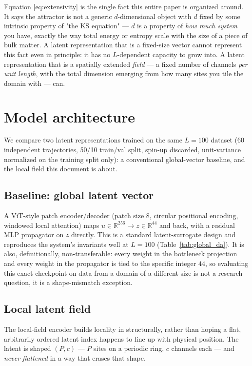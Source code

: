\documentclass[11pt]{article}
\begin{document}
Equation \eqref{eq:extensivity} is the single fact this entire paper is
organized around. It says the attractor is not a generic
$d$-dimensional object with $d$ fixed by some intrinsic property of
"the KS equation" --- $d$ is a property of \emph{how much system} you
have, exactly the way total energy or entropy scale with the size of a
piece of bulk matter. A latent representation that is a fixed-size
vector cannot represent this fact even in principle: it has no
$L$-dependent capacity to grow into. A latent representation that is a
spatially extended \emph{field} --- a fixed number of channels
\emph{per unit length}, with the total dimension emerging from how many
sites you tile the domain with --- can.

\section{Model architecture}
\label{sec:model}

We compare two latent representations trained on the same $L=100$
dataset (60 independent trajectories, 50/10 train/val split, spin-up
discarded, unit-variance normalized on the training split only): a
conventional global-vector baseline, and the local field this document
is about.

\subsection{Baseline: global latent vector}

A ViT-style patch encoder/decoder (patch size 8, circular positional
encoding, windowed local attention) maps $u \in \mathbb{R}^{256} \to z
\in \mathbb{R}^{44}$ and back, with a residual MLP propagator on $z$
directly. This is a standard latent-surrogate design and reproduces the
system's invariants well at $L=100$ (Table~\ref{tab:global_da}). It is
also, definitionally, non-transferable: every weight in the bottleneck
projection and every weight in the propagator is tied to the specific
integer $44$, so evaluating this exact checkpoint on data from a domain
of a different size is not a research question, it is a shape-mismatch
exception.

\subsection{Local latent field}
\label{sec:local_field}

The local-field encoder builds locality in structurally, rather than
hoping a flat, arbitrarily ordered latent index happens to line up with
physical position. The latent is shaped $(P, c)$ --- $P$ sites on a
periodic ring, $c$ channels each --- and \emph{never flattened} in a way
that erases that shape.
\end{document}
